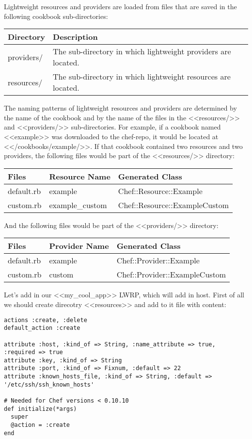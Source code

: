 Lightweight resources and providers are loaded from files that are saved in the following cookbook sub-directories:

\begin{tabular}{ | l | l | }
  \hline
  Directory	& Description \\
  \hline
  providers/ & The sub-directory in which lightweight providers are located. \\
  resources/ & The sub-directory in which lightweight resources are located. \\
  \hline
\end{tabular}

The naming patterns of lightweight resources and providers are determined by the name of the cookbook and by the name of the files in the <<resources/>> and <<providers/>> sub-directories. For example, if a cookbook named <<example>> was downloaded to the chef-repo, it would be located at <</cookbooks/example/>>. If that cookbook contained two resources and two providers, the following files would be part of the <<resources/>> directory:

\begin{tabular}{ | l | l | l | }
  \hline
  Files	& Resource Name	& Generated Class \\
  \hline
  default.rb & example & Chef::Resource::Example \\
  custom.rb	& example\_custom & Chef::Resource::ExampleCustom \\
  \hline
\end{tabular}

And the following files would be part of the <<providers/>> directory:

\begin{tabular}{ | l | l | l | }
  \hline
  Files	& Provider Name	& Generated Class \\
  \hline
  default.rb & example & Chef::Provider::Example \\
  custom.rb	& custom & Chef::Provider::ExampleCustom \\
  \hline
\end{tabular}

Let's add in our <<my\_cool\_app>> LWRP, which will add in  host. First of all we should create direcotry <<resources>> and add to it  file with content:

\begin{lstlisting}[label=lst:cookbook-lwrp1,title=my-server-cloud/site-cookbooks/my\_cool\_app/resources/know\_host.rb]
actions :create, :delete
default_action :create

attribute :host, :kind_of => String, :name_attribute => true, :required => true
attribute :key, :kind_of => String
attribute :port, :kind_of => Fixnum, :default => 22
attribute :known_hosts_file, :kind_of => String, :default => '/etc/ssh/ssh_known_hosts'

# Needed for Chef versions < 0.10.10
def initialize(*args)
  super
  @action = :create
end
\end{lstlisting}

